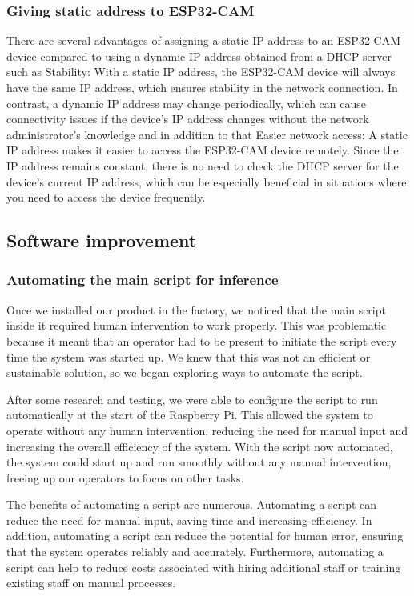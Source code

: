\subsubsection{Giving static address to ESP32-CAM}
There are several advantages of assigning a static IP address to an ESP32-CAM device compared to using a dynamic IP address obtained from a DHCP server such as Stability: With a static IP address, the ESP32-CAM device will always have the same IP address, which ensures stability in the network connection. In contrast, a dynamic IP address may change periodically, which can cause connectivity issues if the device's IP address changes without the network administrator's knowledge
and in addition to that Easier network access: A static IP address makes it easier to access the ESP32-CAM device remotely. Since the IP address remains constant, there is no need to check the DHCP server for the device's current IP address, which can be especially beneficial in situations where you need to access the device frequently.
\subsection{Software improvement}
\subsubsection{Automating the main script for inference}
Once we installed our product in the factory, we noticed that the main script inside it required human intervention to work properly. This was problematic because it meant that an operator had to be present to initiate the script every time the system was started up. We knew that this was not an efficient or sustainable solution, so we began exploring ways to automate the script.

After some research and testing, we were able to configure the script to run automatically at the start of the Raspberry Pi. This allowed the system to operate without any human intervention, reducing the need for manual input and increasing the overall efficiency of the system. With the script now automated, the system could start up and run smoothly without any manual intervention, freeing up our operators to focus on other tasks.

The benefits of automating a script are numerous. Automating a script can reduce the need for manual input, saving time and increasing efficiency. In addition, automating a script can reduce the potential for human error, ensuring that the system operates reliably and accurately. Furthermore, automating a script can help to reduce costs associated with hiring additional staff or training existing staff on manual processes.

